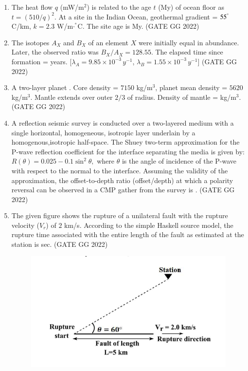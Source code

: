 \documentclass[journal]{IEEEtran}
\begin{document}
\begin{enumerate}
\item The heat flow $q$ (mW/m$^2$) is related to the age $t$ (My) of ocean floor as $t=(510/q)^2$.  At a site in the Indian Ocean, geothermal gradient = $55^\degree$C/km, $k=2.3$ W/m$\cdot^\degree$C. The site age is \makebox[2cm]{\hrulefill} My.  
\hfill(GATE GG 2022)
\vspace{0.5cm}

\item The isotopes $A_X$ and $B_X$ of an element $X$ were initially equal in abundance. Later, the observed ratio was $B_X/A_X = 128.55$.  
The elapsed time since formation =\makebox[2cm]{\hrulefill}  years.  
[$\lambda_A = 9.85 \times 10^{-3} \, y^{-1}$, $\lambda_B = 1.55 \times 10^{-3} \, y^{-1}$]  
\hfill(GATE GG 2022)
\vspace{0.5cm}

\item A two-layer planet . Core density = $7150$ kg/m$^3$,  
planet mean density = $5620$ kg/m$^3$. Mantle extends over outer $2/3$ of radius.  Density of mantle = \makebox[2cm]{\hrulefill} kg/m$^3$.   
\hfill(GATE GG 2022)
\vspace{0.5cm}

\item A reflection seismic survey is conducted over a two-layered medium with a single horizontal, homogeneous, isotropic layer underlain by a homogenous,isotropic half-space. The Shuey two-term approximation for the P-wave reflection coefficient for the interface separating the media is given by:  
$R(\theta) = 0.025 - 0.1 \sin^2 \theta,$
where $\theta$ is the angle of incidence of the P-wave with respect to the normal to the interface. Assuming the validity of the approximation, the offset-to-depth ratio (offset/depth) at which a polarity reversal can be observed in a CMP gather from the survey is \makebox[2cm]{\hrulefill}.   
\hfill(GATE GG 2022)
\vspace{0.5cm}


\item The given figure shows the rupture of a unilateral fault with the rupture velocity ($V_r$) of $2$ km/s. According to the simple Haskell source model, the rupture time associated with the entire length of the fault as estimated at the station is \makebox[2cm]{\hrulefill} sec. 
\text{[Assume: Shear wave speed = 3.5 km/s]}
\hfill(GATE GG 2022)
\begin{figure}[H]
\centering
	\includegraphics[width = 0.4\columnwidth]{figs/18.png}
\caption*{}
\label{fig:q5}
\end{figure}
  

\end{enumerate}
\end{document}
